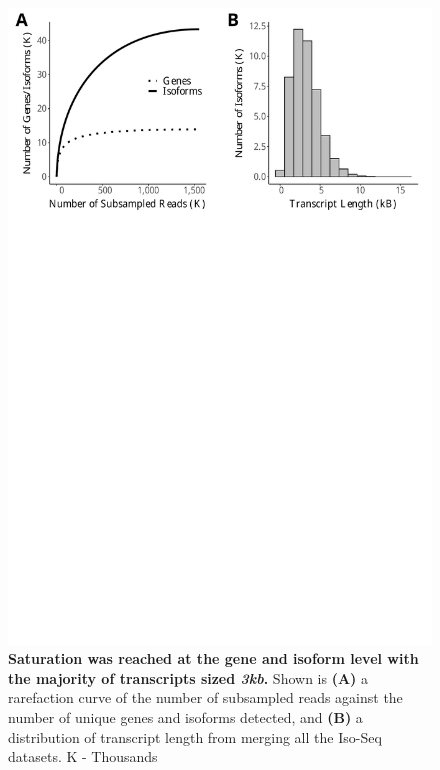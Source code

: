 \vspace{1cm}
\begin{figure}[!h]
	\begin{center}
		\includegraphics[page=1,trim={0 26cm 0 0},clip,scale = 0.55]{Figures/IsoSeqWholeTranscriptome.pdf}
	\end{center}
	\captionsetup{width=0.95\textwidth}
	\caption[Rarefaction curves from global transcriptome profiling of the rTg4510 cortex]%
	{\textbf{Saturation was reached at the gene and isoform level with the majority of transcripts sized \textit{3kb}.} Shown is \textbf{(A)} a rarefaction curve of the number of subsampled reads against the number of unique genes and isoforms detected, and \textbf{(B)} a distribution of transcript length from merging all the Iso-Seq datasets. K - Thousands}
	\label{fig:isoseq_whole_rarefaction}
\end{figure}

